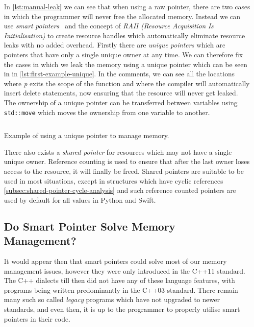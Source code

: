 \documentclass{proposal}
\begin{document}

    In \autoref{lst:manual-leak} we can see that when using a raw pointer, there are two cases in which the programmer will never free the allocated memory.
    Instead we can use \emph{smart pointers}~\cite{Dimov2003} and the concept of \emph{RAII (Resource Acquisition Is Initialisation)} to create resource handles which automatically eliminate resource leaks with no added overhead.
    Firstly there are \emph{unique pointers} which are pointers that have only a single unique owner at any time.
    We can therefore fix the cases in which we leak the memory using a unique pointer which can be seen in in \autoref{lst:first-example-unique}.
    In the comments, we can see all the locations where \emph{p} exits the scope of the function and where the compiler will automatically insert delete statements, now ensuring that the resource will never get leaked.
    The ownership of a unique pointer can be transferred between variables using \texttt{std::move} which moves the ownership from one variable to another.

    \begin{listing}
        \inputminted{c++}{code/first-example-unique.cpp}
        \caption{Example of using a unique pointer to manage memory.}
        \label{lst:first-example-unique}
    \end{listing}

    There also exists a \emph{shared pointer} for resources which may not have a single unique owner.
    Reference counting is used to ensure that after the last owner loses access to the resource, it will finally be freed.
    Shared pointers are suitable to be used in most situations, except in structures which have cyclic references \autoref{subsec:shared-pointer-cycle-analysis} and such reference counted pointers are used by default for all values in Python and Swift.

    \subsection{Do Smart Pointer Solve Memory Management?}\label{subsec:do-smart-pointer-solve-memory-management?}

    It would appear then that smart pointers could solve most of our memory management issues, however they were only introduced in the C++11 standard.
    The C++ dialects till then did not have any of these language features, with programs being written predominantly in the C++03 standard.
    There remain many such so called \emph{legacy} programs which have not upgraded to newer standards, and even then, it is up to the programmer to properly utilise smart pointers in their code.
\end{document}
